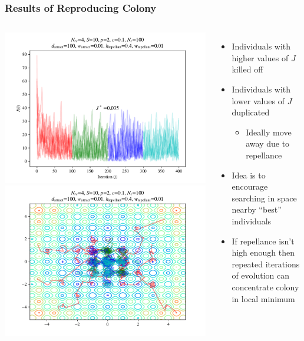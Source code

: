 \documentclass{beamer}
\begin{document}
\begin{frame}
\frametitle{Results of Reproducing Colony}
\begin{columns}
    \begin{center}
      \includegraphics[scale=0.3]{assets/rastrigin_colony_re_J}
      \includegraphics[scale=0.3]{assets/rastrigin_colony_re_theta}
    \end{center}
  \begin{itemize}
    \item<1-> Individuals with higher values of $J$ killed off
    \item<2-> Individuals with lower values of $J$ duplicated
    \begin{itemize}
      \item<2-> Ideally move away due to repellance
    \end{itemize}
    \item<3-> Idea is to encourage searching in space nearby ``best'' individuals
    \item<4-> If repellance isn't high enough then repeated iterations of evolution can concentrate colony in local minimum
  \end{itemize}
\end{columns}
\end{frame}
\end{document}
